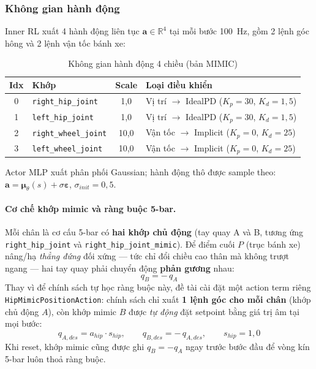 \subsubsection{Không gian hành động}
\label{sec:action_space}

Inner RL xuất 4 hành động liên tục $\mathbf{a}\in\mathbb{R}^4$ tại mỗi bước
100~Hz, gồm 2 lệnh góc hông và 2 lệnh vận tốc bánh xe:

\begin{table}[H]
    \centering
    \caption{Không gian hành động 4 chiều (bản MIMIC)}
    \label{tab:action_cfg}
    \renewcommand{\arraystretch}{1.3}
    \begin{tabular}{|c|l|c|l|}
    \hline
    \textbf{Idx} & \textbf{Khớp} & \textbf{Scale} & \textbf{Loại điều khiển} \\
    \hline
    0 & \texttt{right\_hip\_joint} & 1{,}0 & Vị trí $\to$ IdealPD ($K_p{=}30$, $K_d{=}1{,}5$) \\
    1 & \texttt{left\_hip\_joint}  & 1{,}0 & Vị trí $\to$ IdealPD ($K_p{=}30$, $K_d{=}1{,}5$) \\
    2 & \texttt{right\_wheel\_joint} & 10{,}0 & Vận tốc $\to$ Implicit ($K_p{=}0$, $K_d{=}25$) \\
    3 & \texttt{left\_wheel\_joint}  & 10{,}0 & Vận tốc $\to$ Implicit ($K_p{=}0$, $K_d{=}25$) \\
    \hline
    \end{tabular}
\end{table}

Actor MLP xuất phân phối Gaussian; hành động thô được sample theo:
$\mathbf{a} = \boldsymbol{\mu}_\theta(s) + \sigma\boldsymbol{\varepsilon}$,
$\sigma_{init} = 0{,}5$.

\paragraph{Cơ chế khớp mimic và ràng buộc 5-bar.}
Mỗi chân là cơ cấu 5-bar có \textbf{hai khớp chủ động} (tay quay A và B,
tương ứng \texttt{right\_hip\_joint} và \texttt{right\_hip\_joint\_mimic}).
Để điểm cuối $P$ (trục bánh xe) nâng/hạ \emph{thẳng đứng} đối xứng — tức
chỉ đổi chiều cao thân mà không trượt ngang — hai tay quay phải chuyển động
\textbf{phản gương} nhau:
\begin{equation}
    q_{B} = -\,q_{A}
    \label{eq:mimic_constraint}
\end{equation}
Thay vì để chính sách tự học ràng buộc này, đề tài cài đặt một action term
riêng \texttt{HipMimicPositionAction}: chính sách chỉ xuất \textbf{1 lệnh
góc cho mỗi chân} (khớp chủ động $A$), còn khớp mimic $B$ được \emph{tự
động} đặt setpoint bằng giá trị âm tại mọi bước:
\begin{equation}
    q_{A,des} = a_{hip}\cdot s_{hip},\qquad
    q_{B,des} = -\,q_{A,des},\qquad s_{hip}=1{,}0
    \label{eq:mimic_apply}
\end{equation}
Khi reset, khớp mimic cũng được ghi $q_B = -q_A$ ngay trước bước đầu để vòng
kín 5-bar luôn thoả ràng buộc.

